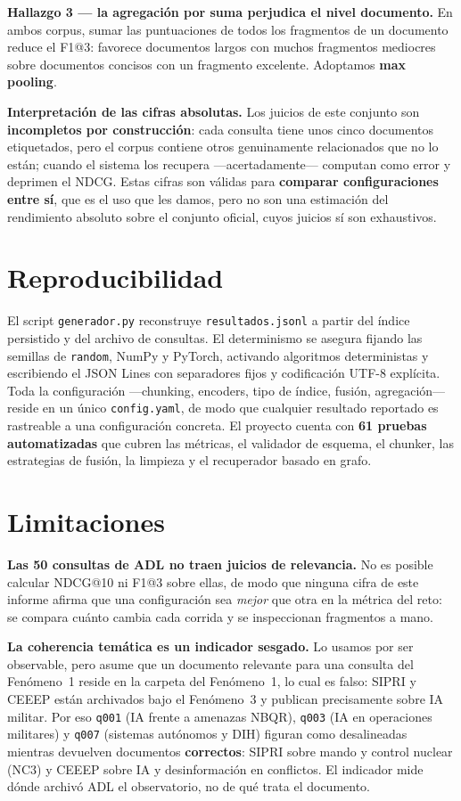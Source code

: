 \documentclass[10pt,a4paper]{article}
\begin{document}
\textbf{Hallazgo 3 — la agregación por suma perjudica el nivel documento.} En ambos corpus, sumar
las puntuaciones de todos los fragmentos de un documento reduce el F1@3: favorece documentos largos
con muchos fragmentos mediocres sobre documentos concisos con un fragmento excelente. Adoptamos
\textbf{max pooling}.

\textbf{Interpretación de las cifras absolutas.} Los juicios de este conjunto son
\textbf{incompletos por construcción}: cada consulta tiene unos cinco documentos etiquetados, pero
el corpus contiene otros genuinamente relacionados que no lo están; cuando el sistema los recupera
—acertadamente— computan como error y deprimen el NDCG. Estas cifras son válidas para
\textbf{comparar configuraciones entre sí}, que es el uso que les damos, pero no son una estimación
del rendimiento absoluto sobre el conjunto oficial, cuyos juicios sí son exhaustivos.

\section{Reproducibilidad}

El script \texttt{generador.py} reconstruye \texttt{resultados.jsonl} a partir del índice
persistido y del archivo de consultas. El determinismo se asegura fijando las semillas de
\texttt{random}, NumPy y PyTorch, activando algoritmos deterministas y escribiendo el JSON Lines
con separadores fijos y codificación UTF-8 explícita. Toda la configuración —chunking, encoders,
tipo de índice, fusión, agregación— reside en un único \texttt{config.yaml}, de modo que cualquier
resultado reportado es rastreable a una configuración concreta. El proyecto cuenta con
\textbf{61 pruebas automatizadas} que cubren las métricas, el validador de esquema, el chunker, las
estrategias de fusión, la limpieza y el recuperador basado en grafo.

\section{Limitaciones}

\textbf{Las 50 consultas de ADL no traen juicios de relevancia.} No es posible calcular NDCG@10 ni
F1@3 sobre ellas, de modo que ninguna cifra de este informe afirma que una configuración sea
\emph{mejor} que otra en la métrica del reto: se compara cuánto cambia cada corrida y se inspeccionan
fragmentos a mano.

\textbf{La coherencia temática es un indicador sesgado.} Lo usamos por ser observable, pero asume
que un documento relevante para una consulta del Fenómeno~1 reside en la carpeta del Fenómeno~1, lo
cual es falso: SIPRI y CEEEP están archivados bajo el Fenómeno~3 y publican precisamente sobre IA
militar. Por eso \texttt{q001} (IA frente a amenazas NBQR), \texttt{q003} (IA en operaciones
militares) y \texttt{q007} (sistemas autónomos y DIH) figuran como desalineadas mientras devuelven
documentos \textbf{correctos}: SIPRI sobre mando y control nuclear (NC3) y CEEEP sobre IA y
desinformación en conflictos. El indicador mide dónde archivó ADL el observatorio, no de qué trata
el documento.
\end{document}
